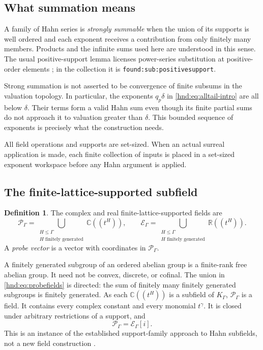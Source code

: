 \documentclass[11pt,oneside]{article}
\theoremstyle{definition}
\newtheorem{definition}[theorem]{Definition}
\theoremstyle{remark}
\newcommand{\R}{\mathbb R}
\newcommand{\C}{\mathbb C}
\newcommand{\Pfield}{\mathscr P_\Gamma}
\newcommand{\Efield}{\mathscr E_\Gamma}
\newcommand{\lbl}[1]{\nolinkurl{#1}}%
\begin{document}
\subsection{What summation means}

A family of Hahn series is \emph{strongly summable} when the union of
its supports is well ordered and each exponent receives a contribution
from only finitely many members. Products and the infinite sums used
here are understood in this sense. The usual positive-support lemma
licenses power-series substitution at positive-order elements
\cite{neumann}; in the collection it is \lbl{found:sub:positivesupport}.

Strong summation is not asserted to be convergence of finite subsums in
the valuation topology. In particular, the exponents $q_p\delta$ in
\eqref{hnd:eq:alltail-intro} are all below $\delta$. Their terms form a valid
Hahn sum even though its finite partial sums do not approach it to
valuation greater than $\delta$. This bounded sequence of exponents is
precisely what the construction needs.

All field operations and supports are set-sized. When an actual surreal
application is made, each finite collection of inputs is placed in a
set-sized exponent workspace before any Hahn argument is applied.

\subsection{The finite-lattice-supported subfield}

\begin{definition}\label{hnd:def:probefield}
The complex and real finite-lattice-supported fields are
\begin{equation}\label{hnd:eq:probefields}
 \Pfield=\bigcup_{\substack{H\le\Gamma\\H\text{ finitely generated}}}
               \C((t^H)),
 \qquad
 \Efield=\bigcup_{\substack{H\le\Gamma\\H\text{ finitely generated}}}
               \R((t^H)).
\end{equation}
A \emph{probe vector} is a vector with coordinates in $\Pfield$.
\end{definition}

A finitely generated subgroup of an ordered abelian group is a finite-rank
free abelian group. It need not be convex, discrete, or cofinal.
The union in \eqref{hnd:eq:probefields} is directed: the sum of finitely many
finitely generated subgroups is finitely generated. As each
$\C((t^H))$ is a subfield of $K_\Gamma$, $\Pfield$ is a field.
It contains every complex constant and every monomial $t^\gamma$.
It is closed under arbitrary restrictions of a support, and
\[
 \Pfield=\Efield[i].
\]
This is an instance of the established support-family approach to Hahn
subfields, not a new field construction \cite{rayner-structures}.
\end{document}
